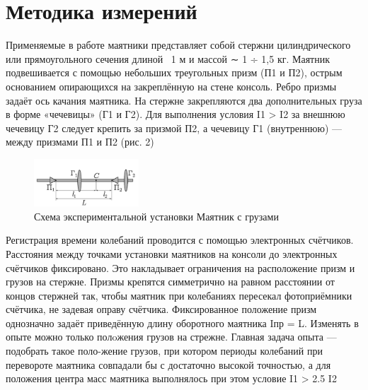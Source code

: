 \documentclass[a4paper, 10pt]{article}%
\begin{document}
\section{Методика измерений} %
Применяемые в работе маятники представляет собой стержни цилиндрического или прямоугольного сечения длиной ~1 м и массой ∼ 1 ÷ 1,5 кг. Маятник подвешивается с помощью небольших треугольных призм
(П1 и П2), острым основанием опирающихся на закреплённую на стене консоль. Ребро призмы задаёт ось качания маятника. На стержне закрепляются
два дополнительных груза в форме «чечевицы» (Г1 и Г2). Для выполнения
условия I1  > I2 за внешнюю чечевицу Г2 следует крепить за призмой П2, а чечевицу Г1 (внутреннюю) — между призмами П1 и П2 (рис. 2)


\begin{figure}[h]
    \centering
    \includegraphics[width=0.35\textwidth]{IMG_1595.jpeg}
    \caption{Схема экспериментальной установки Маятник с грузами}
    \label{fig:mesh1}
\end{figure}


Регистрация времени колебаний проводится с помощью электронных счётчиков. Расстояния между точками установки маятников на консоли до электронных счётчиков фиксировано. Это накладывает ограничения на расположение призм и грузов на стержне. Призмы крепятся симметрично на равном расстоянии от концов стержней так, чтобы маятник при колебаниях пересекал фотоприёмники счётчика, не задевая оправу счётчика.
Фиксированное положение призм однозначно задаёт приведённую
длину оборотного маятника Iпр = L. Изменять в опыте можно только полoжения грузов на стрежне. Главная задача опыта — подобрать такое поло-жение грузов, при котором периоды колебаний при перевороте маятника совпадали бы с достаточно высокой точностью, а для положения центра масс маятника выполнялось при этом условие I1 > 2.5 I2
\end{document}
